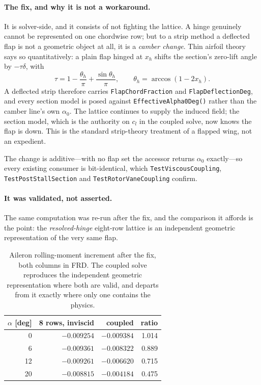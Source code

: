 \documentclass[11pt,a4paper]{article}
\newcommand{\varid}[1]{\texttt{\small #1}}
\begin{document}
\paragraph{The fix, and why it is not a workaround.} It is solver-side,
and it consists of not fighting the lattice. A hinge genuinely cannot be
represented on one chordwise row; but to a strip method a deflected flap
is not a geometric object at all, it is a \emph{camber change}. Thin
airfoil theory says so quantitatively: a plain flap hinged at $x_h$
shifts the section's zero-lift angle by $-\tau\delta$, with
\begin{equation}
\tau = 1 - \frac{\theta_h}{\pi} + \frac{\sin\theta_h}{\pi}, \qquad
\theta_h = \arccos(1 - 2x_h).
\label{eq:tau}
\end{equation}
A deflected strip therefore carries \varid{FlapChordFraction} and
\varid{FlapDeflectionDeg}, and every section model is posed against
\varid{EffectiveAlpha0Deg()} rather than the camber line's own
$\alpha_0$. The lattice continues to supply the induced field; the
section model, which is the authority on $c_l$ in the coupled solve,
now knows the flap is down. This is the standard strip-theory treatment
of a flapped wing, not an expedient.

The change is additive---with no flap set the accessor returns
$\alpha_0$ exactly---so every existing consumer is bit-identical, which
\texttt{TestViscousCoupling}, \texttt{TestPostStallSection} and
\texttt{TestRotorVaneCoupling} confirm.

\paragraph{It was validated, not asserted.} The same computation was re-run
after the fix, and the comparison it affords is the point: the
\emph{resolved-hinge} eight-row lattice is an independent geometric
representation of the very same flap.

\begin{table}[htbp]
\centering
\caption{Aileron rolling-moment increment after the fix, both columns in
FRD. The coupled solve reproduces the independent geometric
representation where both are valid, and departs from it exactly where
only one contains the physics.}
\label{tab:aileronfixed}
\begin{tabular}{@{}rrrr@{}}
\toprule
$\alpha$ [deg] & 8 rows, inviscid & coupled & ratio \\
\midrule
0 & $-0.009254$ & $-0.009384$ & 1.014 \\
6 & $-0.009361$ & $-0.008322$ & 0.889 \\
12 & $-0.009261$ & $-0.006620$ & 0.715 \\
20 & $-0.008815$ & $-0.004184$ & 0.475 \\
\bottomrule
\end{tabular}
\end{table}
\end{document}

